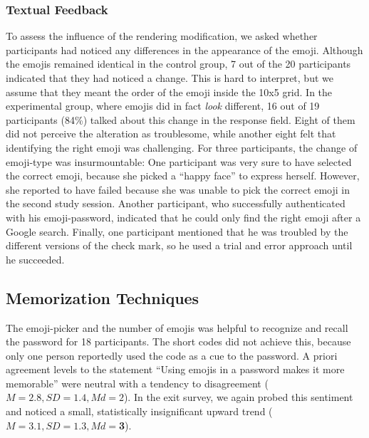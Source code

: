 \subsubsection{Textual Feedback}
To assess the influence of the rendering modification, we asked whether participants had noticed any differences in the appearance of the emoji. Although the emojis remained identical in the control group, 7 out of the 20 participants indicated that they had noticed a change. This is hard to interpret, but we assume that they meant the order of the emoji inside the 10x5 grid. In the experimental group, where emojis did in fact \textit{look} different, 16 out of 19 participants (84\%) talked about this change in the response field. Eight of them did not perceive the alteration as troublesome, while another eight felt that identifying the right emoji was challenging. For three participants, the change of emoji-type was insurmountable: One participant was very sure to have selected the correct emoji, because she picked a ``happy face'' to express herself. However, she reported to have failed because she was unable to pick the correct emoji in the second study session. Another participant, who successfully authenticated with his emoji-password, indicated that he could only find the right emoji after a Google search. Finally, one participant mentioned that he was troubled by the different versions of the check mark, so he used a trial and error approach until he succeeded.

\subsection{Memorization Techniques}
The emoji-picker and the number of emojis was helpful to recognize and recall the password for 18 participants. The short codes did not achieve this, because only one person reportedly used the code as a cue to the password. A priori agreement levels to the statement ``Using emojis in a password makes it more memorable'' were neutral with a tendency to disagreement ($M=2.8, SD=1.4, Md=2$). In the exit survey, we again probed this sentiment and noticed a small, statistically insignificant upward trend ($M=3.1, SD=1.3, Md=$\textbf{3}). 

